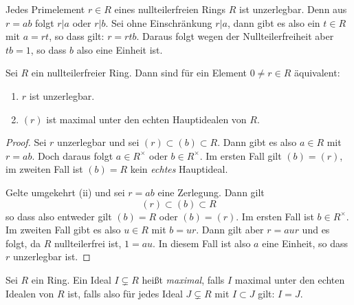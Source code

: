 \documentclass{book}
\begin{document}
\begin{exa}
    \label{exa:primunzer}
    Jedes Primelement $r \in R$ eines nullteilerfreien Rings $R$ ist
    unzerlegbar. Denn aus $r = ab$ folgt $r | a$ oder $r | b$. Sei ohne
    Einschränkung $r|a$, dann gibt es also ein $t \in R$ mit $a = rt$, so dass
    gilt: $r = rtb$. Daraus folgt wegen der Nullteilerfreiheit aber $tb = 1$,
    so dass $b$ also eine Einheit ist. 
\end{exa}

\begin{prop}
    \label{prop:maximalhaupt}
    Sei $R$ ein nullteilerfreier Ring. Dann sind für ein Element $0 \ne r \in R$ äquivalent:
    \begin{enumerate}[label=(\roman *)]
        \item $r$ ist unzerlegbar.
        \item $(r)$ ist maximal unter den echten Hauptidealen von $R$. 
    \end{enumerate}
\end{prop}
\begin{proof}
    Sei $r$ unzerlegbar und sei $(r) \subset (b) \subset R$. Dann gibt es also
    $a \in R$ mit $r = ab$. Doch daraus folgt $a \in R^{\times}$ oder $b \in
    R^{\times}$. Im ersten Fall gilt $(b) = (r)$, im zweiten Fall ist $(b) = R$
    kein \emph{echtes} Hauptideal. 

    Gelte umgekehrt (ii) und sei $r = ab$ eine Zerlegung. Dann gilt
    \[
        (r) \subset (b) \subset R
    \]
    so dass also entweder gilt $(b) = R$ oder $(b) = (r)$. Im ersten Fall ist
    $b \in R^{\times}$. Im zweiten Fall gibt es also $u \in R$ mit $b = ur$. Dann gilt aber
    $r = aur$ und es folgt, da $R$ nullteilerfrei ist, $1 = au$. In diesem Fall
    ist also $a$ eine Einheit, so dass $r$ unzerlegbar ist. 
\end{proof}

\begin{defi}
    \label{defi:maximalideal}
    Sei $R$ ein Ring. Ein Ideal $I \subsetneq R$ heißt \emph{maximal}, falls
    $I$ maximal unter den echten Idealen von $R$ ist, falls also für jedes
    Ideal $J \subsetneq R$ mit $I \subset J$ gilt: $I = J$. 
\end{defi}
\end{document}
